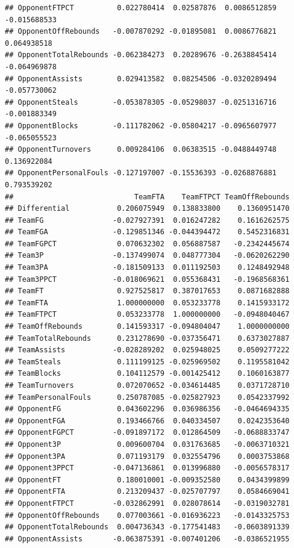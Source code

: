 \documentclass[
]{book}
\begin{document}
\begin{verbatim}
## OpponentFTPCT          0.022780414  0.02587876  0.0086512859 -0.015688533
## OpponentOffRebounds   -0.007870292 -0.01895081  0.0086776821  0.064938518
## OpponentTotalRebounds -0.062384273  0.20289676 -0.2638845414 -0.064969878
## OpponentAssists        0.029413582  0.08254506 -0.0320289494 -0.057730062
## OpponentSteals        -0.053878305 -0.05298037 -0.0251316716 -0.001883349
## OpponentBlocks        -0.111782062 -0.05804217 -0.0965607977 -0.065055523
## OpponentTurnovers      0.009284106  0.06383515 -0.0488449748  0.136922084
## OpponentPersonalFouls -0.127197007 -0.15536393 -0.0268876881  0.793539202
##                            TeamFTA    TeamFTPCT TeamOffRebounds
## Differential           0.206075949  0.138833800    0.1360951470
## TeamFG                -0.027927391  0.016247282    0.1616262575
## TeamFGA               -0.129851346 -0.044394472    0.5452316831
## TeamFGPCT              0.070632302  0.056887587   -0.2342445674
## Team3P                -0.137499074  0.048777304   -0.0620262290
## Team3PA               -0.181509133  0.011192503    0.1248492948
## Team3PPCT             -0.018069621  0.055368431   -0.1968568361
## TeamFT                 0.927525817  0.387017653    0.0871682888
## TeamFTA                1.000000000  0.053233778    0.1415933172
## TeamFTPCT              0.053233778  1.000000000   -0.0948040467
## TeamOffRebounds        0.141593317 -0.094804047    1.0000000000
## TeamTotalRebounds      0.231278690 -0.037356471    0.6373027887
## TeamAssists           -0.028289202  0.025948025    0.0509277222
## TeamSteals             0.111199125 -0.025969502    0.1195581042
## TeamBlocks             0.104112579 -0.001425412    0.1060163877
## TeamTurnovers          0.072070652 -0.034614485    0.0371728710
## TeamPersonalFouls      0.250787085 -0.025827923    0.0542337992
## OpponentFG             0.043602296  0.036986356   -0.0464694335
## OpponentFGA            0.193466766  0.040334507    0.0242353640
## OpponentFGPCT         -0.091897172  0.012864509   -0.0688833747
## Opponent3P             0.009600704  0.031763685   -0.0063710321
## Opponent3PA            0.071193179  0.032554796    0.0003753868
## Opponent3PPCT         -0.047136861  0.013996880   -0.0056578317
## OpponentFT             0.180010001 -0.009352580    0.0434399899
## OpponentFTA            0.213209437 -0.025707797    0.0584669041
## OpponentFTPCT         -0.032862991  0.028078614   -0.0319032781
## OpponentOffRebounds    0.077003661 -0.016936223   -0.0143325753
## OpponentTotalRebounds  0.004736343 -0.177541483   -0.0603891339
## OpponentAssists       -0.063875391 -0.007401206   -0.0386521955

\end{verbatim}
\end{document}

